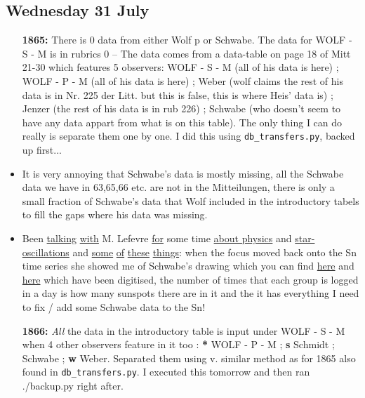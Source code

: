 \documentclass[12pt]{article}
\begin{document}
\subsection{Wednesday 31 July}
\begin{itemize}
    \item[\textbf{1865:}] There is 0 data from either Wolf p or Schwabe. The data for WOLF - S - M is in rubrics 0 -- The data comes from a data-table on page 18 of Mitt 21-30 which features 5 observers: WOLF - S - M (all of his data is here) ; WOLF - P - M (all of his data is here) ; Weber (wolf claims the rest of his data is in Nr. 225 der Litt. but this is false, this is where Heis' data is) ; Jenzer (the rest of his data is in rub 226) ; Schwabe (who doesn't seem to have any data appart from what is on this table). The only thing I can do really is separate them one by one. I did this using \texttt{db\_transfers.py}, backed up first...
    \item It is very annoying that Schwabe's data is mostly missing, all the Schwabe data we have in 63,65,66 etc. are not in the Mitteilungen, there is only a small fraction of Schwabe's data that Wolf included in the introductory tabels to fill the gaps where his data was missing. 
    \item Been \href{https://www.britannica.com/science/accretion-disk}{talking} \href{https://en.wikipedia.org/wiki/Black_body}{with} M. Lefevre \href{https://en.wikipedia.org/wiki/WR_137#/media/File:Wr137_spc.png}{for} some time \href{https://en.wikipedia.org/wiki/WR_124}{about physics} and \href{https://iopscience.iop.org/article/10.1086/498393/pdf}{star-oscillations} and \href{https://en.wikipedia.org/wiki/Blue_giant}{some} \href{https://en.wikipedia.org/wiki/Fortran}{of} \href{https://www.euclid-ec.org/}{these} \href{http://www.stsci.edu/hst/stis/documents/isrs/2015_03.pdf}{things}: when the focus moved back onto the Sn time series she showed me of Schwabe's drawing which you can find \href{https://www.aip.de/Members/rarlt/sunspots/schwabe/paper-schwabe-data}{here} and \href{https://www.aip.de/Members/rarlt/sunspots/schwabe}{here} which have been digitised, the number of times that each group is logged in a day is how many sunspots there are in it and the it has everything I need to fix / add some Schwabe data to the Sn!
    
    \item[\textbf{1866:}] \textit{All} the data in the introductory table is input under WOLF - S - M when 4 other observers feature in it too : \textbf{*} WOLF - P - M ; \textbf{s} Schmidt ; \textbf{\dag} Schwabe ; \textbf{w} Weber. Separated them using v. similar method as for 1865 also found in \texttt{db\_transfers.py}. I executed this tomorrow and then ran ./backup.py right after.
\end{itemize}
\end{document}
